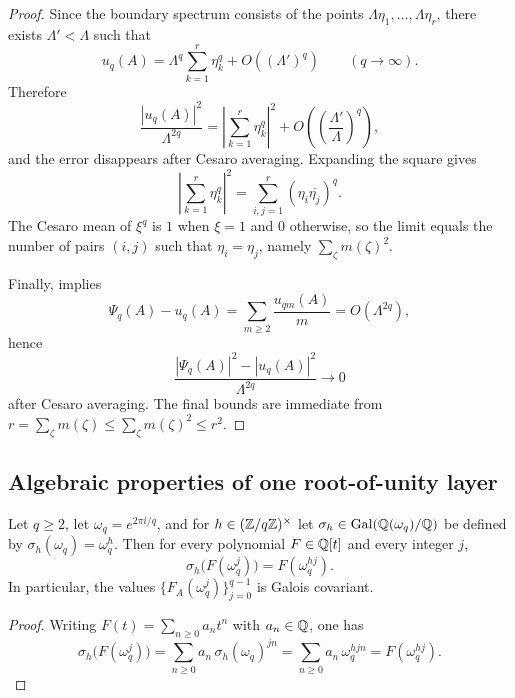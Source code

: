 \begin{proof}
  Since the boundary spectrum consists of the points
  \(\Lambda\eta_1,\dots,\Lambda\eta_r\), there exists
  \(\Lambda'<\Lambda\) such that
  \[
    u_q(A)=\Lambda^q\sum_{k=1}^r\eta_k^q+O((\Lambda')^q)
    \qquad (q\to\infty).
  \]
  Therefore
  \[
    \frac{|u_q(A)|^2}{\Lambda^{2q}}
    =\left|\sum_{k=1}^r\eta_k^q\right|^2
      +O\!\left(\left(\frac{\Lambda'}{\Lambda}\right)^q\right),
  \]
  and the error disappears after Cesaro averaging. Expanding the square
  gives
  \[
    \left|\sum_{k=1}^r\eta_k^q\right|^2
    =\sum_{i,j=1}^r(\eta_i\overline{\eta_j})^q.
  \]
  The Cesaro mean of \(\xi^q\) is \(1\) when \(\xi=1\) and \(0\)
  otherwise, so the limit equals the number of pairs \((i,j)\) such
  that \(\eta_i=\eta_j\), namely \(\sum_{\zeta}m(\zeta)^2\).

  Finally,
   implies
  \[
    \Psi_q(A)-u_q(A)=\sum_{m\ge 2}\frac{u_{qm}(A)}{m}
    =O(\Lambda^{2q}),
  \]
  hence
  \[
    \frac{|\Psi_q(A)|^2-|u_q(A)|^2}{\Lambda^{2q}}\to 0
  \]
  after Cesaro averaging. The final bounds are immediate from
  \(r=\sum_\zeta m(\zeta)\le \sum_\zeta m(\zeta)^2\le r^2\).
\end{proof}

\subsection{Algebraic properties of one root-of-unity layer}

\begin{proposition}
  \label{prop:finite-part-torsion-table-galois-covariance}
  Let \(q\ge 2\), let \(\omega_q=e^{2\pi i/q}\), and for
  \(h\in(\mathbb{Z}/q\mathbb{Z})^\times\) let
  \(\sigma_h\in\operatorname{Gal}(\mathbb{Q}(\omega_q)/\mathbb{Q})\) be defined by
  \(\sigma_h(\omega_q)=\omega_q^h\). Then for every polynomial
  \(F\in\mathbb{Q}[t]\) and every integer \(j\),
  \[
    \sigma_h\!\bigl(F(\omega_q^j)\bigr)=F(\omega_q^{hj}).
  \]
  In particular, the values
  \(\{F_A(\omega_q^j)\}_{j=0}^{q-1}\) is Galois covariant.
\end{proposition}

\begin{proof}
  Writing \(F(t)=\sum_{n\ge 0}a_nt^n\) with \(a_n\in\mathbb{Q}\), one has
  \[
    \sigma_h\!\bigl(F(\omega_q^j)\bigr)
    =\sum_{n\ge 0}a_n\,\sigma_h(\omega_q)^{jn}
    =\sum_{n\ge 0}a_n\,\omega_q^{hjn}
    =F(\omega_q^{hj}).
  \]
\end{proof}

